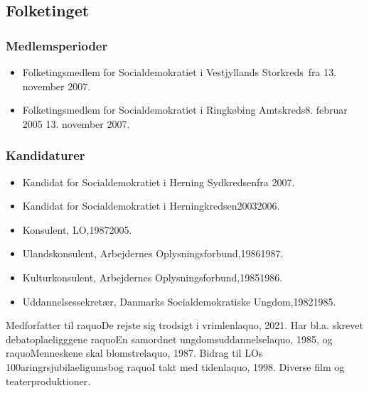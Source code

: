 \documentclass[11pt, a4paper]{awesome-cv}
\begin{document}
\begin{cvletter}
\subsection*{Folketinget}
\subsubsection*{Medlemsperioder}
\begin{itemize}
\item Folketingsmedlem for Socialdemokratiet i Vestjyllands Storkreds fra 13. november 2007.
\item Folketingsmedlem for Socialdemokratiet i Ringkøbing Amtskreds8. februar 2005  13. november 2007.
\end{itemize}
\subsubsection*{Kandidaturer}
\begin{itemize}
\item Kandidat for Socialdemokratiet i Herning Sydkredsenfra 2007.
\item Kandidat for Socialdemokratiet i Herningkredsen20032006.
\end{itemize}
\begin{itemize}
\item Konsulent, LO,19872005.
\item Ulandskonsulent, Arbejdernes Oplysningsforbund,19861987.
\item Kulturkonsulent, Arbejdernes Oplysningsforbund,19851986.
\item Uddannelsessekretær, Danmarks Socialdemokratiske Ungdom,19821985.
\end{itemize}
Medforfatter til raquoDe rejste sig trodsigt i vrimlenlaquo, 2021. Har bl.a. skrevet debatoplaeligggene raquoEn samordnet ungdomsuddannelselaquo, 1985, og raquoMenneskene skal blomstrelaquo, 1987. Bidrag til LOs 100aringrsjubilaeligumsbog raquoI takt med tidenlaquo, 1998. Diverse film og teaterproduktioner.

\end{cvletter}
\end{document}
